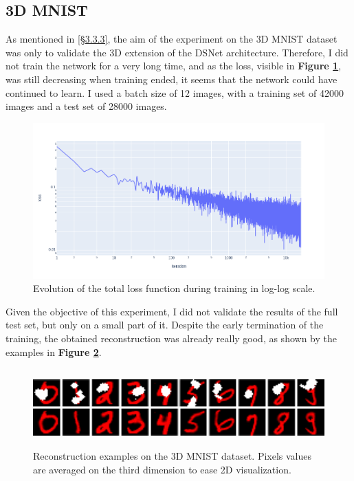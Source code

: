 \documentclass{article}
\begin{document}
\subsection{3D MNIST}

As mentioned in \hyperref[sec:ext]{[\S3.3.3]}, the aim of the experiment on the 3D MNIST dataset was only to validate the 3D extension of the DSNet architecture. Therefore, I did not train the network for a very long time, and as the loss, visible in \textbf{Figure \ref{fig:3d_mnist_loss}}, was still decreasing when training ended, it seems that the network could have continued to learn. I used a batch size of 12 images, with a training set of 42000 images and a test set of 28000 images.
\begin{figure}[H]
    \centering
    \includegraphics[height=6cm,width=\textwidth,keepaspectratio]{3d_mnist_loss.png}
    \caption{Evolution of the total loss function during training in log-log scale.}
    \label{fig:3d_mnist_loss}
\end{figure}
Given the objective of this experiment, I did not validate the results of the full test set, but only on a small part of it. Despite the early termination of the training, the obtained reconstruction was already really good, as shown by the examples in \textbf{Figure \ref{fig:3d_mnist_imp}}.
\begin{figure}[H]
    \centering
    \includegraphics[height=3cm,width=\textwidth,keepaspectratio]{3d_mnist_imp.png}
    \caption{Reconstruction examples on the 3D MNIST dataset. Pixels values are averaged on the third dimension to ease 2D visualization.}
    \label{fig:3d_mnist_imp}
\end{figure}
\end{document}
